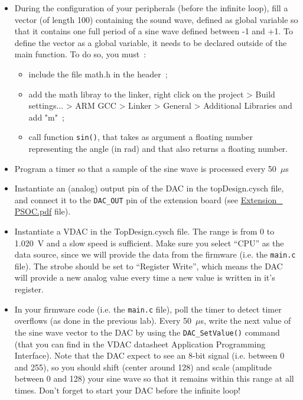 \begin{itemize}
	\item During the configuration of your peripherals (before the infinite loop), fill a vector (of length 100) containing the sound wave, defined as global variable so that it contains one full period of a sine wave defined between -1 and +1. To define the vector as a global variable, it needs to be declared outside of the main function. 
    To do so, you must~:
	\begin{itemize}
		\item include the file math.h in the header~;
		\item add the math libray to the linker, right click on the project > Build settings... > ARM GCC > Linker > General > Additional Libraries and add "m"~;
		\item call function \texttt{sin()}, that takes as argument a floating number representing the angle (in rad) and that also returns a floating number.
	\end{itemize}
	\item Program a timer so that a sample of the sine wave is processed every 50~$\mu$s
	\item Instantiate an (analog) output pin of the DAC in the topDesign.cysch file, and connect it to the \texttt{DAC\_OUT} pin of the extension board (see \url{Extension\_ PSOC.pdf} file). 
	\item Instantiate a VDAC in the TopDesign.cysch file. The range is from 0 to 1.020~V and a slow speed is sufficient. Make sure you select ``CPU'' as the data source, since we will provide the data from the firmware (i.e. the \texttt{main.c} file). The strobe should be set to ``Register Write'', which means the DAC will provide a new analog value every time a new value is written in it's register. 
	\item In your firmware code (i.e. the \texttt{main.c} file), poll the timer to detect timer overflows (as done in the previous lab). Every 50~$\mu$s, write the next value of the sine wave vector to the DAC by using the \texttt{DAC\_SetValue()} command (that you can find in the VDAC datasheet Application Programming Interface). Note that the DAC expect to see an 8-bit signal (i.e. between 0 and 255), so you should shift (center around 128) and scale (amplitude between 0 and 128) your sine wave so that it remains within this range at all times. Don't forget to start your DAC before the infinite loop! 
\end{itemize}





